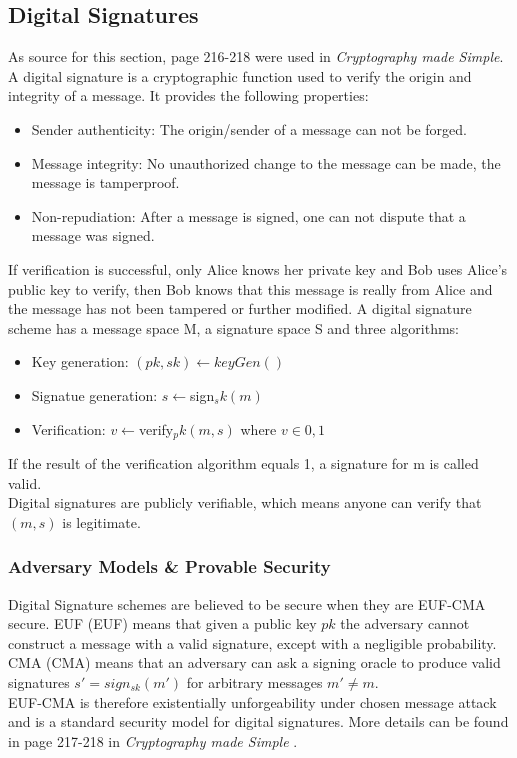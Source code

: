 \subsection{Digital Signatures}
\label{sec:sign-schemes}
As source for this section, page 216-218 were used in \textit{Cryptography made Simple}\cite{modernCrypto}.
A digital signature is a cryptographic function used to verify the origin and integrity of a message.
It provides the following properties:
\begin{itemize}
    \item Sender authenticity: The origin/sender of a message can not be forged.
    \item Message integrity: No unauthorized change to the message can be made, the message is tamperproof.
    \item Non-repudiation: After a message is signed, one can not dispute that a message was signed.
\end{itemize}
If verification is successful, only Alice knows her private key and Bob uses Alice's public key to verify, then Bob knows that this message is really from Alice and the message has not been tampered or further modified.
A digital signature scheme has a message space M, a signature space S and three algorithms:
\begin{itemize}
    \item Key generation: $(pk,sk) \gets keyGen()$
    \item Signatue generation: $s \gets $sign$_sk(m)$
    \item Verification: $ v \gets $verify$_pk(m,s)$ where $v \in {0,1}$
\end{itemize}
If the result of the verification algorithm equals 1, a signature for m is called valid.
\\Digital signatures are publicly verifiable, which means anyone can verify that $(m,s)$ is legitimate.

\subsubsection{Adversary Models \& Provable Security}
\label{sec:euf-cma}
Digital Signature schemes are believed to be secure when they are EUF-CMA secure.
\acl{EUF} (\ac{EUF}) means that given a public key $pk$ the adversary cannot construct a message with a valid signature, except with a negligible probability.
\acl{CMA} (\ac{CMA}) means that an adversary can ask a signing oracle to produce valid signatures $s' = sign_{sk}(m')$ for arbitrary messages $m' \ne m$.\\
EUF-CMA is therefore existentially unforgeability under chosen message attack and is a standard security model for digital signatures.
More details can be found in page 217-218 in \textit{Cryptography made Simple} \cite{modernCrypto}.


